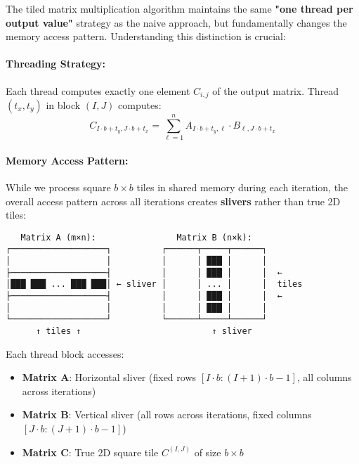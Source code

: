 \documentclass{amsbook}
\theoremstyle{definition}
\begin{document}
The tiled matrix multiplication algorithm maintains the same \textbf{"one thread per output value"} strategy as the naive approach, but fundamentally changes the memory access pattern. Understanding this distinction is crucial:

\paragraph{Threading Strategy:} Each thread computes exactly one element $C_{i,j}$ of the output matrix. Thread $(t_x, t_y)$ in block $(I, J)$ computes:
\begin{equation}
C_{I \cdot b + t_y, J \cdot b + t_x} = \sum_{\ell=1}^{n} A_{I \cdot b + t_y, \ell} \cdot B_{\ell, J \cdot b + t_x}
\end{equation}

\paragraph{Memory Access Pattern:} While we process square $b \times b$ tiles in shared memory during each iteration, the overall access pattern across all iterations creates \textbf{slivers} rather than true 2D tiles:

\begin{center}
    \begin{verbatim}
   Matrix A (m×n):                Matrix B (n×k):
┌───────────────────┐          ┌──────┬─────┬──────┐
│                   │          │      │ ███ │      │
├───────────────────┤          │      │ ███ │      │  ←
│███ ███ ... ███ ███│ ← sliver │      │ ... │      │  tiles
├───────────────────┤          │      │ ███ │      │  ←
│                   │          │      │ ███ │      │
└───────────────────┘          └──────┴─────┴──────┘
      ↑ tiles ↑                          ↑ sliver
    \end{verbatim}
\end{center}

Each thread block accesses:
\begin{itemize}
\item \textbf{Matrix A}: Horizontal sliver (fixed rows $[I \cdot b : (I+1) \cdot b - 1]$, all columns across iterations)
\item \textbf{Matrix B}: Vertical sliver (all rows across iterations, fixed columns $[J \cdot b : (J+1) \cdot b - 1]$)
\item \textbf{Matrix C}: True 2D square tile $C^{(I,J)}$ of size $b \times b$
\end{itemize}
\end{document}
